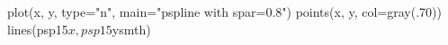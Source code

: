 \begin{Schunk}
\begin{Sinput}
 plot(x, y, type="n", main="pspline with spar=0.8")
 points(x, y, col=gray(.70))
 lines(psp15$x, psp15$ysmth)
\end{Sinput}
\end{Schunk}
